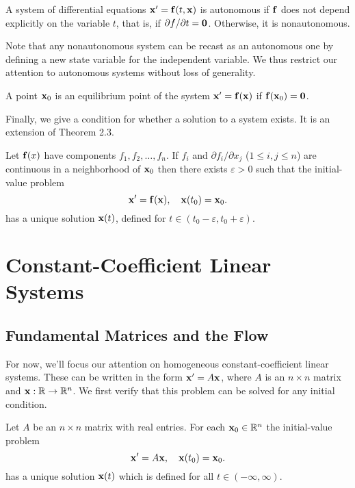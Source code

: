 \documentclass[../m082main.tex]{subfiles}
\begin{document}
\begin{definition}
    A system of differential equations $\mathbf{x}' = \mathbf{f}(t, \mathbf{x})$ is autonomous if $\mathbf{f}$ does not depend explicitly on the variable $t$, that is, if $\partial f / \partial t = \mathbf{0}$.
    Otherwise, it is nonautonomous.
\end{definition}

Note that any nonautonomous system can be recast as an autonomous one by defining a new state variable for the independent variable.
We thus restrict our attention to autonomous systems without loss of generality.

\begin{definition}
    A point $\mathbf{x}_0$ is an equilibrium point of the system $\mathbf{x}' = \mathbf{f}(\mathbf{x})$ if $\mathbf{f}(\mathbf{x}_0) = \mathbf{0}$.
\end{definition}

Finally, we give a condition for whether a solution to a system exists.
It is an extension of Theorem 2.3.

\begin{theorem}
    Let $\mathbf{f}(x)$ have components $f_1, f_2, \ldots, f_n$.
    If $f_i$ and $\partial f_i / \partial x_j$ ($1 \leq i,j \leq n$) are continuous in a neighborhood of $\mathbf{x}_0$ then there exists $\varepsilon > 0$ such that the initial-value problem
    \[ \mathbf{x}' = \mathbf{f}(\mathbf{x}), \quad \mathbf{x}(t_0) = \mathbf{x}_0. \]
    has a unique solution $\mathbf{x}(t)$, defined for $t \in (t_0 - \varepsilon, t_0 + \varepsilon)$.
\end{theorem}

\section{Constant-Coefficient Linear Systems}
\subsection{Fundamental Matrices and the Flow}
For now, we'll focus our attention on homogeneous constant-coefficient linear systems.
These can be written in the form $\mathbf{x}' = A \mathbf{x}$, where $A$ is an $n \times n$ matrix and $\mathbf{x} : \mathbb{R} \to \mathbb{R}^n$.
We first verify that this problem can be solved for any initial condition.

\begin{theorem}
    Let $A$ be an $n \times n$ matrix with real entries.
    For each $\mathbf{x}_0 \in \mathbb{R}^n$ the initial-value problem
    \[ \mathbf{x}' = A\mathbf{x}, \quad \mathbf{x}(t_0) = \mathbf{x}_0. \]
    has a unique solution $\mathbf{x}(t)$ which is defined for all $t \in (-\infty, \infty)$.
\end{theorem}
\end{document}

